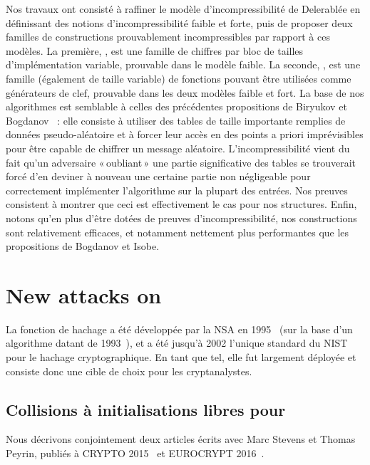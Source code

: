 Nos travaux ont consisté à raffiner le modèle d'incompressibilité de Delerablée \etal en définissant des notions d'incompressibilité faible et forte, puis de proposer deux familles de constructions
prouvablement incompressibles par rapport à ces modèles. La première, \pc, est une famille de chiffres par bloc de tailles d'implémentation variable, prouvable dans le modèle
faible. La seconde, \cdb, est une famille (également de taille variable) de fonctions
pouvant être utilisées comme générateurs de clef, prouvable dans les deux modèles faible et fort. La base de nos algorithmes est semblable à celles des précédentes propositions de Biryukov \etal
et Bogdanov \etal~: elle consiste à utiliser des tables de taille importante remplies de données pseudo-aléatoire et à forcer leur accès en des points a priori imprévisibles pour être capable de
chiffrer un message aléatoire. L'incompressibilité vient du fait qu'un adversaire «\,oubliant\,» une partie significative des tables se trouverait forcé d'en deviner à nouveau une certaine partie
non négligeable
pour correctement implémenter l'algorithme sur la plupart des entrées. Nos preuves consistent à montrer que ceci est effectivement le cas pour nos structures. Enfin, notons qu'en plus d'être
dotées de preuves d'incompressibilité, nos constructions sont relativement efficaces, et notamment nettement plus performantes que les propositions de Bogdanov et Isobe.

\section[Nouvelles attaques sur la fonction de hachage \shaone]{New attacks on \shaone}

La fonction de hachage \shaone a été développée par la NSA en 1995~\cite{Nist-SHA1} (sur la base d'un algorithme datant de 1993~\cite{Nist-SHA0}), et a été jusqu'à 2002 l'unique standard du NIST pour
le hachage cryptographique. En tant que tel, elle fut largement déployée et consiste donc une cible de choix pour les cryptanalystes.

\subsection{Collisions à initialisations libres pour \shaone \cite{DBLP:conf/crypto/KarpmanPS15,DBLP:conf/eurocrypt/StevensKP16}}

Nous décrivons conjointement deux articles écrits avec Marc Stevens et Thomas Peyrin, publiés à CRYPTO 2015~\cite{DBLP:conf/crypto/KarpmanPS15} et EUROCRYPT 2016~\cite{DBLP:conf/eurocrypt/StevensKP16}.

